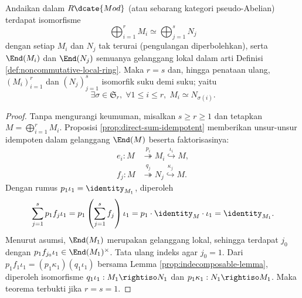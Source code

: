 \begin{theorem}\label{prop:KRS-uniqueness}
	Andaikan dalam $R\dcate{Mod}$ (atau sebarang kategori pseudo-Abelian) terdapat isomorfisme
	\[ \bigoplus_{i=1}^r M_i \simeq \bigoplus_{j=1}^s N_j \]
dengan setiap $M_i$ dan $N_j$ tak terurai (pengulangan diperbolehkan), serta $\End(M_i)$ dan $\End(N_j)$ semuanya gelanggang lokal dalam arti Definisi \ref{def:noncommutative-local-ring}. Maka $r=s$ dan, hingga penataan ulang, $(M_i)_{i=1}^r$ dan $(N_j)_{j=1}^s$ isomorfik suku demi suku; yaitu
	\[\exists \sigma \in \mathfrak{S}_r, \; \forall 1 \leq i \leq r, \; M_i \simeq N_{\sigma(i)}. \]
\end{theorem}
\begin{proof}
	Tanpa mengurangi keumuman, misalkan $s \geq r \geq 1$ dan tetapkan $M = \bigoplus_{i=1}^r M_i$. Proposisi \ref{prop:direct-sum-idempotent} memberikan unsur-unsur idempoten dalam gelanggang $\End(M)$ beserta faktorisasinya:
	\begin{align*}
		e_i: M & \stackrel{p_i}{\twoheadrightarrow} M_i \stackrel{\iota_i}{\hookrightarrow} M, \\
		f_j: M & \stackrel{q_j}{\twoheadrightarrow} N_j \stackrel{\kappa_j}{\hookrightarrow} M.
	\end{align*}
	Dengan rumus $p_1 \iota_1 = \identity_{M_1}$, diperoleh
	\[ \sum_{j=1}^s p_1 f_j \iota_1 = p_1 \left( \sum_{j=1}^s f_j \right) \iota_1 = p_1 \cdot \identity_M \cdot \iota_1 = \identity_{M_1}. \]
Menurut asumsi, $\End(M_1)$ merupakan gelanggang lokal, sehingga terdapat $j_0$ dengan $p_1 f_{j_0} \iota_1 \in \End(M_1)^\times$. Tata ulang indeks agar $j_0=1$. Dari $p_1 f_1 \iota_1 = (p_1 \kappa_1) (q_1 \iota_1)$ bersama Lemma \ref{prop:indecomposable-lemma}, diperoleh isomorfisme $q_1 \iota_1: M_1 \rightiso N_1$ dan $p_1 \kappa_1: N_1 \rightiso M_1$. Maka teorema terbukti jika $r=s=1$.
	

\end{proof}
